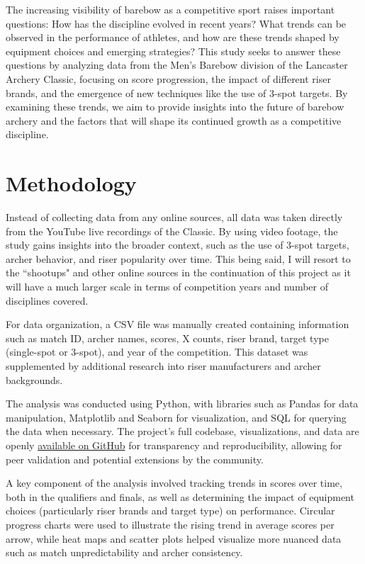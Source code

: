 \documentclass{article}
\begin{document}
The increasing visibility of barebow as a competitive sport raises important questions: How has the discipline evolved in recent years? What trends can be observed in the performance of athletes, and how are these trends shaped by equipment choices and emerging strategies? This study seeks to answer these questions by analyzing data from the Men's Barebow division of the Lancaster Archery Classic, focusing on score progression, the impact of different riser brands, and the emergence of new techniques like the use of 3-spot targets. By examining these trends, we aim to provide insights into the future of barebow archery and the factors that will shape its continued growth as a competitive discipline.

\section{Methodology}
Instead of collecting data from any online sources, all data was taken directly from the YouTube live recordings of the Classic. By using video footage, the study gains insights into the broader context, such as the use of 3-spot targets, archer behavior, and riser popularity over time. This being said, I will resort to the ``shootups" and other online sources in the continuation of this project as it will have a much larger scale in terms of competition years and number of disciplines covered. 

For data organization, a CSV file was manually created containing information such as match ID, archer names, scores, X counts, riser brand, target type (single-spot or 3-spot), and year of the competition. This dataset was supplemented by additional research into riser manufacturers and archer backgrounds.

The analysis was conducted using Python, with libraries such as Pandas for data manipulation, Matplotlib and Seaborn for visualization, and SQL for querying the data when necessary. The project’s full codebase, visualizations, and data are openly \href{https://github.com/brunocassani/LA-Classic-Analysis}{available on GitHub} for transparency and reproducibility, allowing for peer validation and potential extensions by the community.

A key component of the analysis involved tracking trends in scores over time, both in the qualifiers and finals, as well as determining the impact of equipment choices (particularly riser brands and target type) on performance. Circular progress charts were used to illustrate the rising trend in average scores per arrow, while heat maps and scatter plots helped visualize more nuanced data such as match unpredictability and archer consistency.
\end{document}
